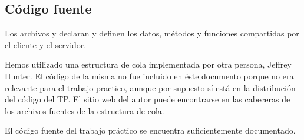 \subsection{Código fuente}

Los archivos  y  declaran y definen los
datos, métodos y funciones compartidas por el cliente y el servidor.

Hemos utilizado una estructura de cola implementada por otra persona, Jeffrey
Hunter. El código de la misma no fue incluido en éste documento porque no era
relevante para el trabajo practico, aunque por supuesto sí está en la
distribución del código del TP. El sitio web del autor puede encontrarse en las
cabeceras de los archivos fuentes de la estructura de cola.

El código fuente del trabajo práctico se encuentra suficientemente documentado.






